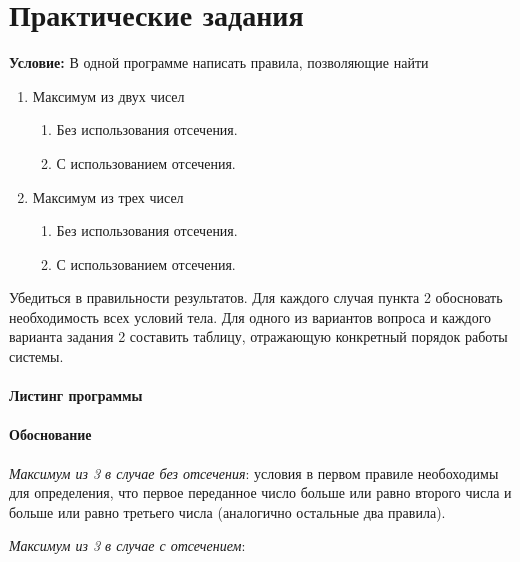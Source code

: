 \chapter{Практические задания}

\textbf{Условие:} В одной программе написать правила, позволяющие найти 

\begin{enumerate}
	\item Максимум из двух чисел
	\begin{enumerate}
		\item Без использования отсечения.
		\item С использованием отсечения.
	\end{enumerate}

	\item Максимум из трех чисел
	\begin{enumerate}
		\item Без использования отсечения.
		\item С использованием отсечения.
	\end{enumerate}
\end{enumerate}

Убедиться в правильности результатов. Для каждого случая пункта 2 обосновать необходимость всех условий тела. Для  одного из вариантов вопроса и  каждого  варианта задания  2 составить таблицу, отражающую конкретный порядок работы системы.

\subsubsection{Листинг программы}




\subsubsection{Обоснование}

\textit{Максимум из 3 в случае без отсечения}: условия в первом правиле необоходимы для определения, что первое переданное число больше или равно второго числа и больше или равно третьего числа (аналогично остальные два правила).

\textit{Максимум из 3 в случае с отсечением}:


